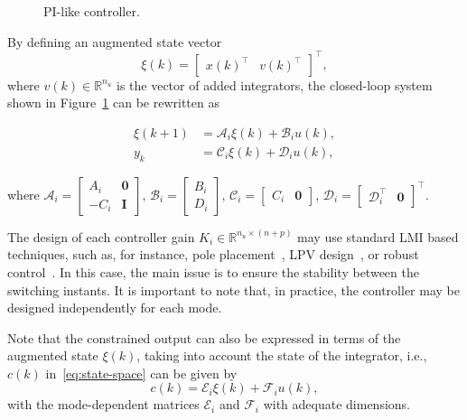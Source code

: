 \begin{figure}[!htb]
  \centering
  \resizebox{0.98\linewidth}{!}{}
  \caption{PI-like controller.}%
  \label{fig:pi-controller-diagram}
\end{figure}

By defining an augmented state vector
\[
  \xi(k)=\begin{bmatrix}{x(k)}^\top &v{(k)}^\top\end{bmatrix}^\top,
\]
where \(v(k)\in\mathbb{R}^{n_u}\) is the vector of added integrators, the
closed-loop system shown in Figure~\ref{fig:pi-controller-diagram} can be
rewritten as

\begin{equation}
  \label{sistemaaum}
  \begin{split}
    \xi(k+1) &= \mathcal{A}_i\xi(k)+\mathcal{B}_{i}u(k), \\
    y_{k}    &= \mathcal{C}_i\xi(k)+\mathcal{D}_{i}u(k),
  \end{split}
\end{equation}

where \(\mathcal{A}_i=\begin{bmatrix}A_i & \textbf{0} \\-C_{i}&\textbf{I}
\end{bmatrix} \), \(\mathcal{B}_i=\begin{bmatrix}B_i\\D_i\end{bmatrix}\),
\(\mathcal{C}_i=\begin{bmatrix} C_i & \textbf{0} \end{bmatrix}\),
\(\mathcal{D}_i=\begin{bmatrix}\mathcal{D}_i^\top&\textbf{0}\end{bmatrix}^\top\).

The design of each controller gain \(K_i\in\mathbb{R}^{n_u\times{}(n+p)}\) may use
standard LMI based techniques, such as, for instance, pole
placement~\parencite{yu:lmis}, LPV design~\parencite{briat:linear}, or robust
control~\parencite{boyd.ghaoui.ea:linear}. In this case, the main issue is to
ensure the stability between the switching instants. It is important to note
that, in practice, the controller may be designed independently for each mode.

Note that the constrained output can also be expressed in terms of the augmented
state \(\xi(k)\), taking into account the state of the integrator, i.e., \(c(k)\)
in~\eqref{eq:state-space} can be given by
%
\begin{equation}
  \label{eq:constrained-output}
  c(k) = \mathcal{E}_i\xi(k) + \mathcal{F}_i u(k),
\end{equation}
%
with the mode-dependent matrices \(\mathcal{E}_i\) and \(\mathcal{F}_i\) with
adequate dimensions.

